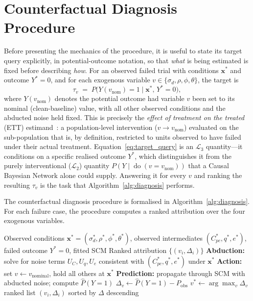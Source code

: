 \documentclass[11pt,a4paper]{report}
\newcommand{\doop}{\operatorname{do}}
\begin{document}
\section{Counterfactual Diagnosis Procedure}
\label{sec:counterfactual_diagnosis}

Before presenting the mechanics of the procedure, it is useful to state its target query explicitly, in potential-outcome notation, so that \emph{what} is being estimated is fixed before describing \emph{how}. For an observed failed trial with conditions $\mathbf{x}^*$ and outcome $Y^* = 0$, and for each exogenous variable $v \in \{\sigma_d, \rho, \phi, \theta\}$, the target is
\begin{equation}
  \tau_v \;=\; P\big(Y(v_{\text{nom}}) = 1 \;\big|\; \mathbf{x}^*, \, Y^* = 0\big),
  \label{eq:target_query}
\end{equation}
where $Y(v_{\text{nom}})$ denotes the potential outcome had variable $v$ been set to its nominal (clean-baseline) value, with all other observed conditions and the abducted noise held fixed. This is precisely the \emph{effect of treatment on the treated} (ETT) estimand~\cite{yang2025hierarchy}: a population-level intervention ($v \to v_{\text{nom}}$) evaluated on the sub-population that is, by definition, restricted to units observed to have failed under their actual treatment. Equation~\eqref{eq:target_query} is an $\mathcal{L}_3$ quantity---it conditions on a specific realised outcome $Y^*$, which distinguishes it from the purely interventional ($\mathcal{L}_2$) quantity $P(Y \mid \doop(v = v_{\text{nom}}))$ that a Causal Bayesian Network alone could supply. Answering it for every $v$ and ranking the resulting $\tau_v$ is the task that Algorithm~\ref{alg:diagnosis} performs.

The counterfactual diagnosis procedure is formalised in Algorithm~\ref{alg:diagnosis}. For each failure case, the procedure computes a ranked attribution over the four exogenous variables.

\begin{algorithm}[t]
\caption{SCM Counterfactual Failure Diagnosis}
\label{alg:diagnosis}
\begin{algorithmic}[1]
\Require Observed conditions $\mathbf{x}^* = (\sigma_d^*, \rho^*, \phi^*, \theta^*)$, observed intermediates $(C_{pc}^*, q^*, e^*)$, failed outcome $Y^* = 0$, fitted SCM
\Ensure Ranked attribution $\{(v_i, \Delta_i)\}$
\State \textbf{Abduction:} solve for noise terms $U_C, U_q, U_e$ consistent with $(C_{pc}^*, q^*, e^*)$ under $\mathbf{x}^*$
  \State \textbf{Action:} set $v \leftarrow v_{\text{nominal}}$, hold all others at $\mathbf{x}^*$
  \State \textbf{Prediction:} propagate through SCM with abducted noise; compute $\hat{P}(Y{=}1)$
  \State $\Delta_v \leftarrow \hat{P}(Y{=}1) - P_{\text{obs}}$
\EndFor
\State $v^* \leftarrow \arg\max_v \Delta_v$
\State \Return ranked list $(v_i, \Delta_i)$ sorted by $\Delta$ descending
\end{algorithmic}
\end{algorithm}
\end{document}
